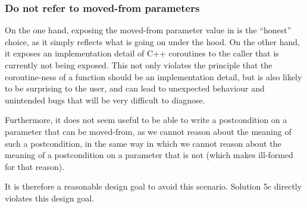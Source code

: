 \subsubsection{Do not refer to moved-from  parameters}

On the one hand, exposing the moved-from parameter value in  is the ``honest'' choice, as it simply reflects what is going on under the hood. On the other hand, it exposes an implementation detail of C++ coroutines to the caller that is currently not being exposed. This not only violates the principle that the coroutine-ness of a function should be an implementation detail, but is also likely to be surprising to the user, and can lead to unexpected behaviour and unintended bugs that will be very difficult to diagnose.

Furthermore, it does not seem useful to be able to write a postcondition on a parameter that can be moved-from, as we cannot reason about the meaning of such a postcondition, in the same way in which we cannot reason about the meaning of a postcondition on a parameter that is not  (which \cite{P2900R8} makes ill-formed for that reason).

It is therefore a reasonable design goal to avoid this scenario. Solution 5c directly violates this design goal.


